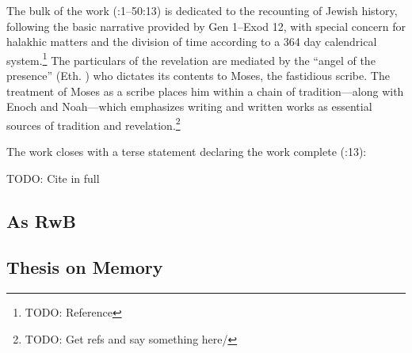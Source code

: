 The bulk of the work (:1--50:13) is dedicated to the recounting of Jewish history, following the basic narrative provided by Gen 1--Exod 12, with special concern for halakhic matters and the division of time according to a 364 day calendrical system.\footnote{TODO: Reference} The particulars of the revelation are mediated by the ``angel of the presence'' (Eth. ) who dictates its contents to Moses, the fastidious scribe. The treatment of Moses as a scribe places him within a chain of tradition---along with Enoch and Noah---which emphasizes writing and written works as essential sources of tradition and revelation.\footnote{TODO: Get refs and say something here/}

The work closes with a terse statement declaring the work complete (:13):

    TODO: Cite in full

    

\subsection{As RwB}


\subsection{Thesis on Memory}
